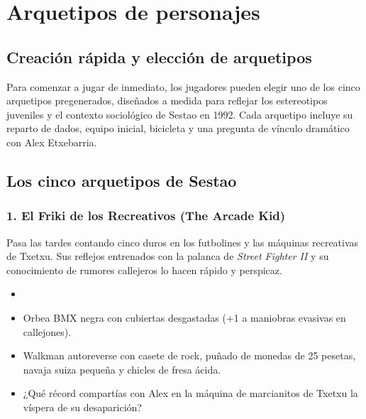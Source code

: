 \chapter{Arquetipos de personajes}

\section{Creación rápida y elección de arquetipos}

Para comenzar a jugar de inmediato, los jugadores pueden elegir uno de los cinco arquetipos pregenerados, diseñados a medida para reflejar los estereotipos juveniles y el contexto sociológico de Sestao en 1992. Cada arquetipo incluye su reparto de dados, equipo inicial, bicicleta y una pregunta de vínculo dramático con Alex Etxebarria.

\section{Los cinco arquetipos de Sestao}

\subsection{1. El Friki de los Recreativos (The Arcade Kid)}
Pasa las tardes contando cinco duros en los futbolines y las máquinas recreativas de Txetxu. Sus reflejos entrenados con la palanca de \emph{Street Fighter II} y su conocimiento de rumores callejeros lo hacen rápido y perspicaz.
\begin{itemize}
  \item {}      
  \item {} Orbea BMX negra con cubiertas desgastadas (+1 a maniobras evasivas en callejones).
  \item {} Walkman autoreverse con casete de rock, puñado de monedas de 25 pesetas, navaja suiza pequeña y chicles de fresa ácida.
  \item {} ¿Qué récord compartías con Alex en la máquina de marcianitos de Txetxu la víspera de su desaparición?
\end{itemize}

